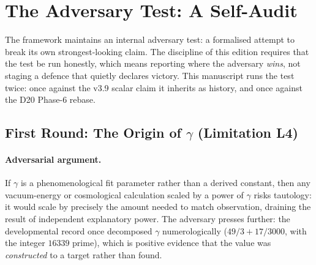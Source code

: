 \documentclass[12pt,a4paper,twoside]{article}
\theoremstyle{plain}
\theoremstyle{definition}
\theoremstyle{remark}
\begin{document}
\section{The Adversary Test: A Self-Audit}
\label{sec:adversary}

\noindent The framework maintains an internal adversary test: a
formalised attempt to break its own strongest-looking claim. The
discipline of this edition requires that the test be run honestly, which
means reporting where the adversary \emph{wins}, not staging a defence
that quietly declares victory. This manuscript runs the test twice: once against the v3.9 scalar claim it
inherits as history, and once against the D20 Phase-6 rebase.

\subsection{First Round: The Origin of \texorpdfstring{$\gamma$}{gamma} (Limitation L4)}
\label{subsec:adversary-gamma}

\paragraph{Adversarial argument.}
If $\gamma$ is a phenomenological fit parameter rather than a derived
constant, then any vacuum-energy or cosmological calculation scaled by a
power of $\gamma$ risks tautology: it would scale by precisely the amount
needed to match observation, draining the result of independent
explanatory power. The adversary presses further: the developmental
record once decomposed $\gamma$ numerologically ($49/3 + 17/3000$, with
the integer $16339$ prime), which is positive evidence that the value was
\emph{constructed} to a target rather than found.
\end{document}

